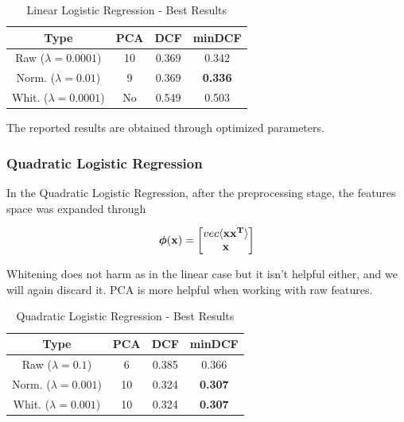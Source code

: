 \documentclass[hidelinks, 12pt, twocolumn]{article}
\begin{document}
\begin{table}[H]
    \centering
    \small
        \begin{tabular}{||c|c|c|c||}
            \hline
            Type & PCA & DCF & minDCF \\
            \hline
            \hline
            Raw ($\lambda = 0.0001$) & 10 & 0.369 &  0.342  \\
            Norm. ($\lambda = 0.01$) & 9 & 0.369 &  {\bf 0.336}  \\
            Whit. ($\lambda = 0.0001$) & No & 0.549 &  0.503  \\
            \hline
    \end{tabular}
    \caption{Linear Logistic Regression - Best Results}
\end{table}

The reported results are obtained through optimized parameters.

\subsubsection{Quadratic Logistic Regression}

In the Quadratic Logistic Regression, after the preprocessing stage, the features space
was expanded through 

$$ {\bf \boldsymbol{\phi}(x)} = {
    \begin{bmatrix}
    vec\langle{\bf xx^T}\rangle\\
    {\bf x}
    \end{bmatrix}}
$$ 

Whitening does not harm as in the linear case but it isn't helpful either, and we will again discard it.
PCA is more helpful when working with raw features.

\begin{table}[H]
    \centering
    \small
        \begin{tabular}{||c|c|c|c||}
            \hline
            Type & PCA & DCF & minDCF \\
            \hline
            \hline
            Raw ($\lambda = 0.1$) & 6 & 0.385 &  0.366  \\
            Norm. ($\lambda = 0.001$) & 10 & 0.324 &  {\bf 0.307}  \\
            Whit. ($\lambda = 0.001$) & 10 & 0.324 &  {\bf 0.307}  \\
            \hline
    \end{tabular}
    \caption{Quadratic Logistic Regression - Best Results}
\end{table}
\end{document}
